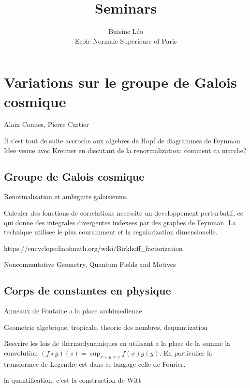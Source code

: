 \documentclass[a4paper]{book}
\theoremstyle{definition}
\theoremstyle{remark}
\begin{document}
\title{Seminars}
\author{Buisine Léo\\Ecole Normale Superieure of Paris}
\maketitle

\tableofcontents

\chapter{Variations sur le groupe de Galois cosmique}
Alain Connes, Pierre Cartier \par \medskip 

Il s'est tout de suite accroche aux algebres de Hopf de diagrammes de Feynman. Idee venue avec Kreimer en discutant de la renormalization: comment ca marche? 

\section{Groupe de Galois cosmique}
Renormalisation et ambiguite galoisienne. \par \medskip 

Calculer des fonctions de correlations necessite un developpement perturbatif, ce qui donne des integrales divergentes indexees par des graphes de Feynman. La technique utilisee le plus couramment et la regularization dimensionelle. \par \medskip 

https://encyclopediaofmath.org/wiki/Birkhoff\_factorization \par \medskip 

Noncommutative Geometry, Quantum Fields and Motives


\section{Corps de constantes en physique}
Anneaux de Fontaine a la place archimedienne \par \medskip 

Geometrie algebrique, tropicale, theorie des nombres, dequantization

Reecrire les lois de thermodynamiques en utilisant a la place de la somme la convolution $(f\star g) (z)= \sup_{x+y = z} f(x)g(y)$. En particulier la transformee de Legendre est dans ce langage celle de Fourier.

la quantification, c'est la construction de Witt
\end{document}
